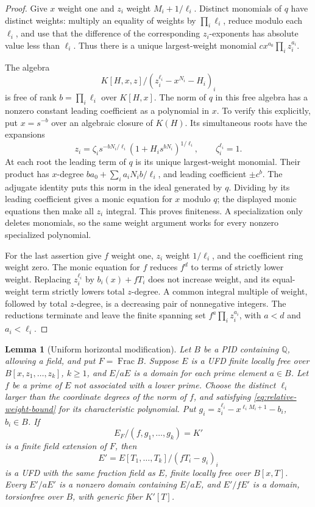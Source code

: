 \documentclass[11pt,reqno]{amsart}
\numberwithin{equation}{section}
\theoremstyle{plain}
\newtheorem{lemma}[theorem]{Lemma}
\theoremstyle{definition}
\theoremstyle{remark}
\begin{document}
\begin{proof}
Give \(x\) weight one and \(z_i\) weight \(M_i+1/\ell_i\).
Distinct monomials of \(q\) have distinct weights: multiply an
equality of weights by \(\prod_i\ell_i\), reduce modulo each
\(\ell_i\), and use that the difference of the corresponding
\(z_i\)-exponents has absolute value less than \(\ell_i\).
Thus there is a unique largest-weight monomial
\(c x^{a_0}\prod_i z_i^{a_i}\).

The algebra
\[
 K[H,x,z]/(z_i^{\ell_i}-x^{N_i}-H_i)_i
\]
is free of rank \(b=\prod_i\ell_i\) over \(K[H,x]\).  The norm
of \(q\) in this free algebra has a nonzero constant leading
coefficient as a polynomial in \(x\).  To verify this explicitly,
put \(x=s^{-b}\) over an algebraic closure of \(K(H)\).  Its
simultaneous roots have the expansions
\[
 z_i=\zeta_i s^{-bN_i/\ell_i}
          (1+H_i s^{bN_i})^{1/\ell_i},\qquad\zeta_i^{\ell_i}=1.
\]
At each root the leading term of \(q\) is its unique largest-weight
monomial.  Their product has \(x\)-degree
\(b a_0+\sum_i a_iN_ib/\ell_i\), and leading coefficient
\(\pm c^b\).  The adjugate identity puts this norm in the ideal
generated by \(q\).  Dividing by its leading coefficient gives
a monic equation for \(x\) modulo \(q\); the displayed monic
equations then make all \(z_i\) integral.  This proves finiteness.
A specialization only deletes monomials, so the same weight argument
works for every nonzero specialized polynomial.

For the last assertion give \(f\) weight one, \(z_i\) weight
\(1/\ell_i\), and the coefficient ring weight zero.  The monic
equation for \(f\) reduces \(f^d\) to terms of strictly lower
weight.  Replacing \(z_i^{\ell_i}\) by \(b_i(x)+fT_i\) does
not increase weight, and its equal-weight term strictly lowers total
\(z\)-degree.  A common integral multiple of weight, followed by
total \(z\)-degree, is a decreasing pair of nonnegative integers.
The reductions terminate and leave the finite spanning set
\(f^a\prod_i z_i^{a_i}\), with \(a<d\) and \(a_i<\ell_i\).
\end{proof}

\begin{lemma}[Uniform horizontal modification]\label{lem:relative-horizontal}
Let \(B\) be a PID containing \(\mathbb Q\), allowing a field,
and put \(F=\operatorname{Frac}B\).  Suppose \(E\) is a UFD
finite locally free over \(B[x,z_1,\ldots,z_k]\), \(k\ge1\),
and \(E/aE\) is a domain for each prime element \(a\in B\).
Let \(f\) be a prime of \(E\) not associated with a lower prime.
Choose the distinct \(\ell_i\) larger than the coordinate degrees
of the norm of \(f\), and satisfying
\eqref{eq:relative-weight-bound} for its characteristic polynomial.
Put \(g_i=z_i^{\ell_i}-x^{\ell_iM_i+1}-b_i\), \(b_i\in B\).
If
\[
 E_F/(f,g_1,\ldots,g_k)=K'
\]
is a finite field extension of \(F\), then
\[
 E'=E[T_1,\ldots,T_k]/(fT_i-g_i)_i
\]
is a UFD with the same fraction field as \(E\), finite locally
free over \(B[x,T]\).  Every \(E'/aE'\) is a nonzero domain
containing \(E/aE\), and \(E'/fE'\) is a domain, torsionfree
over \(B\), with generic fiber \(K'[T]\).
\end{lemma}
\end{document}
